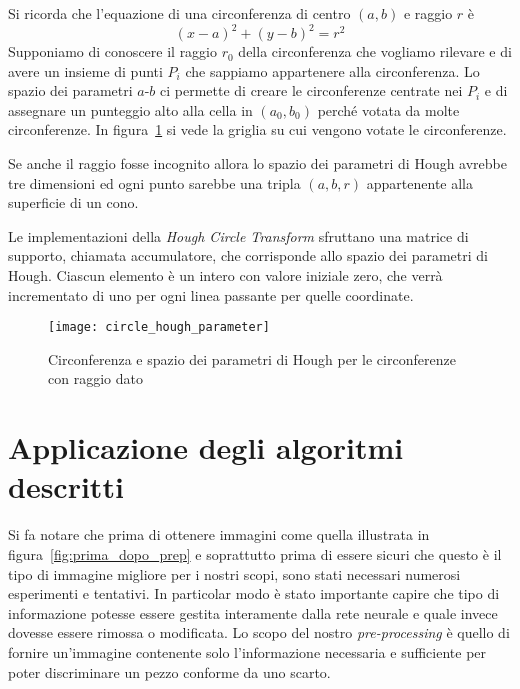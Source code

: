 Si ricorda che l'equazione di una circonferenza di centro $(a,b)$ e raggio $r$ è
\begin{equation} \label{eq:circonferenza}
  (x - a)^2 + (y - b)^2 = r^2
\end{equation}
Supponiamo di conoscere il raggio $r_0$ della circonferenza che vogliamo rilevare e di avere un insieme di punti $P_i$ che sappiamo appartenere alla circonferenza.
Lo spazio dei parametri $a$-$b$ ci permette di creare le circonferenze centrate nei $P_i$ e di assegnare un punteggio alto alla cella in $(a_0,b_0)$ perché votata da molte circonferenze.
In figura~\ref{fig:hough_parametr_circ} si vede la griglia su cui vengono votate le circonferenze.

Se anche il raggio fosse incognito allora lo spazio dei parametri di Hough avrebbe tre dimensioni ed ogni punto sarebbe una tripla $(a,b,r)$ appartenente alla superficie di un cono.

Le implementazioni della \textit{Hough Circle Transform} sfruttano una matrice di supporto, chiamata accumulatore, che corrisponde allo spazio dei parametri di Hough.
Ciascun elemento è un intero con valore iniziale zero, che verrà incrementato di uno per ogni linea passante per quelle coordinate.
\begin{figure}[ht]
  \begin{center}
      \texttt{[image: circle\_hough\_parameter]}
      \caption{Circonferenza e spazio dei parametri di Hough per le circonferenze con raggio dato}
      \label{fig:hough_parametr_circ}
  \end{center}
\end{figure}



\clearpage
\section {Applicazione degli algoritmi descritti} \label{prep}
Si fa notare che prima di ottenere immagini come quella illustrata in figura~\ref{fig:prima_dopo_prep} e soprattutto prima di essere sicuri che questo è il tipo di immagine migliore per i nostri scopi, sono stati necessari numerosi esperimenti e tentativi.
In particolar modo è stato importante capire che tipo di informazione potesse essere gestita interamente dalla rete neurale e quale invece dovesse essere rimossa o modificata.
Lo scopo del nostro \textit{pre-processing} è quello di fornire un'immagine contenente solo l'informazione necessaria e sufficiente per poter discriminare un pezzo conforme da uno scarto.

